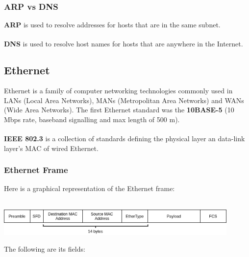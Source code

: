 \documentclass{article}
\begin{document}
\subsubsection{ARP vs DNS}
\textbf{ARP} is used to resolve addresses for hosts that are in the same subnet. \\ \\
\textbf{DNS} is used to resolve host names for hosts that are anywhere in the Internet.

\subsection{Ethernet}
Ethernet is a family of computer networking technologies commonly used in LANs (Local Area Networks), MANs (Metropolitan Area Networks) and WANs (Wide Area Networks). The first Ethernet standard was the \textbf{10BASE-5} (10 Mbps rate, baseband signalling and max length of 500 m). \\ \\
\textbf{IEEE 802.3} is a collection of standards defining the physical layer an data-link layer's MAC of wired Ethernet.

\subsubsection{Ethernet Frame}
Here is a graphical representation of the Ethernet frame:\\ \\
	
\centerline{\includegraphics[width=12cm]{./assets/ethernet.png}}
\vspace{.6cm}
\noindent The following are its fields:
\end{document}

